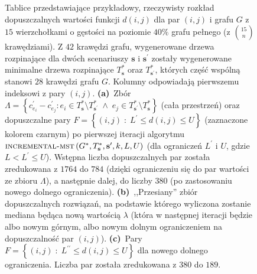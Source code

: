 {\begin{figure}[!htbp]
\begin{subfigure}[b]{0.3\textwidth}
{\begin{tabu}{|c|c|c|c|c|c|c|c|c|c|c|c|c|c|c|c|c|c|c|c|c|c|c|c|c|c|c|c|}
			\end{tabu}%
		}
		\caption{}
		\label{fig:imstSeed:c}
	\end{subfigure}
	\hfill\null
	\caption{
		Tablice przedstawiające przykładowy, rzeczywisty rozkład dopuszczalnych wartości funkcji $d \left( i, j \right)$ dla par $\left( i, j \right)$ i grafu $G$ z $15$ wierzchołkami o gęstości na poziomie $40\%$ grafu pełnego (z $\binom{15}{n}$ krawędziami). Z $42$ krawędzi grafu, wygenerowane drzewa rozpinające dla dwóch scenariuszy $\textbf{s}$ i $\textbf{s}^{\prime}$ zostały wygenerowane minimalne drzewa rozpinające $T^{\ast}_{\textbf{s}}$ oraz $T^{\ast}_{\textbf{s}^{\prime}}$, których część wspólną stanowi $28$ krawędzi grafu $G$. Kolumny odpowiadają pierwszemu indeksowi z pary $\left( i, j \right)$.
		\textbf{(a)}~Zbór $\Lambda = \left\{ c^{\prime}_{e_{i}} - c^{\prime}_{e_{j}} : e_{i} \in T^{\ast}_{\textbf{s}} \setminus T^{\ast}_{\textbf{s}^{\prime}} \; \wedge \; e_{j} \in T^{\ast}_{\textbf{s}^{\prime}} \setminus T^{\ast}_{\textbf{s}} \right\}$ (cała przestrzeń) oraz dopuszczalne pary $F = \left\{ \left( i, j \right) \; : \; L^{\prime} \leqslant d \left( i, j \right) \leqslant U \right\}$ (zaznaczone kolorem czarnym) po pierwszej iteracji algorytmu $\textsc{incremental-mst} \left( G^{\ast}, T^{\ast}_{\textbf{s}}, \textbf{s}^{\prime}, k, L, U \right)$ (dla ograniczeń $L^{\prime}$ i $U$, gdzie $L < L^{\prime} \leqslant U$). Wstępna liczba dopuszczalnych par została zredukowana z $1764$ do $784$ (dzięki ograniczeniu się do par wartości ze zbioru $\Lambda$), a następnie dalej, do liczby $380$ (po zastosowaniu nowego dolnego ograniczenia).
		\textbf{(b)}~,,Przesiany'' zbiór dopuszczalnych rozwiązań, na podstawie którego wyliczona zostanie mediana będąca nową wartością $\lambda$ (która w następnej iteracji będzie albo nowym górnym, albo nowym dolnym ograniczeniem na dopuszczalność par $\left( i, j \right)$).
		\textbf{(c)}~Pary $F = \left\{ \left( i, j \right) \; : \; L^{\prime\prime} \leqslant d \left( i, j \right) \leqslant U \right\}$ dla nowego dolnego ograniczenia. Liczba par została zredukowana z $380$ do $189$.
	}
	\label{fig:imstSeed}
\end{figure}

}
